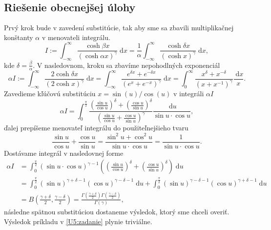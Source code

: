 \documentclass[10pt,a4paper]{article}
\newcommand{\const}[1]{\text{#1}}
\renewcommand{\d}[1]{\;\const{d}#1}
\begin{document}
\subsection{Riešenie obecnejšej úlohy}
Prvý krok bude v zavedení substitúcie, tak aby sme sa zbavili multiplikačnej konštanty $\alpha$ v menovateli integrálu. 
\begin{equation}
    I:= \int_{-\infty}^{\infty} \frac{\cosh \beta x}{(\cosh \alpha x)^{\gamma}} \d x=\frac{1}{\alpha}\int_{-\infty}^{\infty} \frac{\cosh \delta x}{(\cosh x)^{\gamma}} \d x,
\end{equation}
kde $\delta=\frac{\beta}{\alpha}$. V nasledovnom, kroku sa zbavíme nepohodlných exponenciál
\begin{equation}
\alpha I:=
\int_{-\infty}^{\infty} \frac{2 \cosh \delta x}{(2 \cosh x)^{\gamma}} \d x=
\int_{-\infty}^{\infty} \frac{e^{\delta x}+e^{-\delta x}}{\left(e^{x}+e^{-x}\right)^{\gamma}} \d x=
\int_{0}^{\infty} \frac{x^{\delta}+x^{-\delta}}{\left(x+x^{-1}\right)^{\gamma}} \frac{\d x}{x}.
\end{equation}
Zavedieme kľúčovú substitúciu $x=\sin(u)/\cos(u)$ v integráli $\alpha I$
\begin{equation}
\alpha I = \int_{0}^{\frac{\pi}{2}} \frac{\left(\frac{\sin u}{\cos u}\right)^{\delta}+\left(\frac{\cos u}{\sin u}\right)^{\delta}}{\left(\frac{\sin u}{\cos u}+\frac{\cos u}{\sin u}\right)^{\gamma}} \frac{\d u}{\sin u \cdot \cos u},
\end{equation}
ďalej prepíšeme menovateľ integrálu do použiteľnejšieho tvaru 
\begin{equation}
\frac{\sin u}{\cos u}+\frac{\cos u}{\sin u}=\frac{\sin ^{2} u+\cos ^{2} u}{\sin u \cdot \cos u}=\frac{1}{\sin u \cdot \cos u}.
\end{equation}
Dostávame integrál v nasledovnej forme
\begin{equation}
    \begin{aligned}
\alpha I&=\int_{0}^{\frac{\pi}{2}}(\sin u \cdot \cos u)^{\gamma-1}\left(\left(\frac{\sin u}{\cos u}\right)^{\delta}+\left(\frac{\cos u}{\sin u}\right)^{\delta}\right) \d u \\
&=\int_{0}^{\frac{\pi}{2}}(\sin u)^{\gamma+\delta-1}(\cos u)^{\gamma-\delta-1} \d u+\int_{0}^{\frac{\pi}{2}}(\sin u)^{\gamma-\delta-1}(\cos u)^{\gamma+\delta-1} \d u \\
&=B\left(\frac{\gamma+\delta}{2}, \frac{\gamma-\delta}{2}\right)=\frac{\Gamma\left(\frac{\gamma+\delta}{2}\right) \Gamma\left(\frac{\gamma-\delta}{2}\right)}{\Gamma(\gamma)},
    \end{aligned}
\end{equation}
následne spätnou substitúciou dostaneme výsledok, ktorý sme chceli overiť. Výsledok príkladu v \ref{U5:zadanie} plynie triviálne.
\pagebreak
\end{document}
